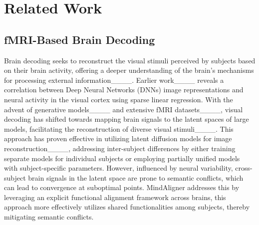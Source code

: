 \section{Related Work}
\subsection{fMRI-Based Brain Decoding}
Brain decoding seeks to reconstruct the visual stimuli perceived by subjects based on their brain activity, offering a deeper understanding of the brain's mechanisms for processing external information____.
Earlier work____ reveals a correlation between Deep Neural Networks (DNNs) image representations and neural activity in the visual cortex using sparse linear regression.
With the advent of generative models____ and extensive fMRI datasets____, visual decoding has shifted towards mapping brain signals to the latent spaces of large models, facilitating the reconstruction of diverse visual stimuli____.
This approach has proven effective in utilizing latent diffusion models for image reconstruction____, addressing inter-subject differences by either training separate models for individual subjects or employing partially unified models with subject-specific parameters.
However, influenced by neural variability, cross-subject brain signals in the latent space are prone to semantic conflicts, which can lead to convergence at suboptimal points.
MindAligner addresses this by leveraging an explicit functional alignment framework across brains, this approach more effectively utilizes shared functionalities among subjects, thereby mitigating semantic conflicts.

